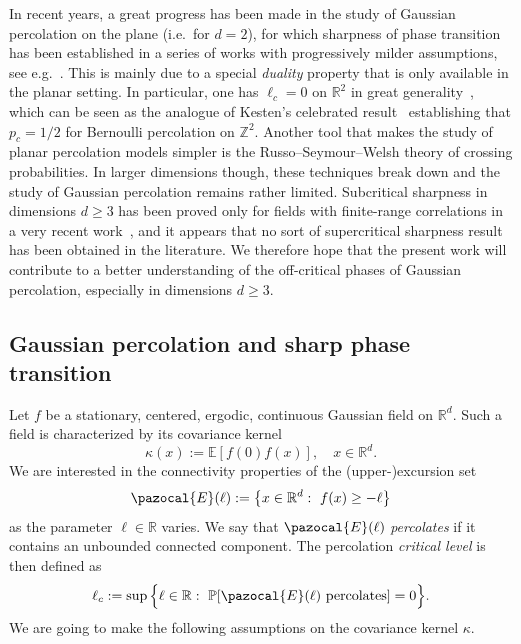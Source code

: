 \documentclass[10pt]{amsart}
\theoremstyle{definition}\newtheorem{defi}[theo]{Definition}\newtheorem{rema}[theo]{Remark}\newtheorem{exam}[theo]{Example}\newtheorem{exem}[theo]{Example}\newtheorem{nota}[theo]{Notation}
\renewcommand{\P}{\mathbb{P}}
\newcommand{\E}{\mathbb{E}}
\newcommand{\R}{\mathbb{R}}
\newcommand{\Z}{\mathbb{Z}}
\begin{document}
In recent years, a great progress has been made in the study of Gaussian percolation on the plane (i.e.~for $d=2$), for which sharpness of phase transition has been established in a series of works with progressively milder assumptions, see e.g.~\cite{Riv19,RVb,MRV20,MV}. This is mainly due to a special \emph{duality} property that is only available in the planar setting. In particular, one has $\ell_c=0$ on $\R^2$ in great generality~\cite{MRV20}, which can be seen as the analogue of Kesten's celebrated result~\cite{Kes80} establishing that $p_c=1/2$ for Bernoulli percolation on $\Z^2$. Another tool that makes the study of planar percolation models simpler is the Russo--Seymour--Welsh theory of crossing probabilities. In larger dimensions though, these techniques break down and the study of Gaussian percolation remains rather limited. Subcritical sharpness in dimensions $d\geq3$ has been proved only for fields with finite-range correlations in a very recent work~\cite{DM21}, and it appears that no sort of supercritical sharpness result has been obtained in the literature. We therefore hope that the present work will contribute to a better understanding of the off-critical phases of Gaussian percolation, especially in dimensions $d\geq3$.


\subsection{Gaussian percolation and sharp phase transition}

Let $f$ be a stationary, centered, ergodic, continuous Gaussian field on $\R^d$. Such a field is characterized by its covariance kernel
\begin{equation}
\kappa(x):=\E\left[f(0)f(x)\right],\quad x\in\R^d.
\end{equation}
We are interested in the connectivity properties of the (upper-)excursion set
\begin{equation}
\pazocal{E}(\ell):=\left\{x\in\R^d:~f(x)\geq -\ell\right\}
\end{equation}
as the parameter $\ell\in \R$ varies. We say that $\pazocal{E}(\ell)$ \emph{percolates} if it contains an unbounded connected component. The percolation \emph{critical level} is then defined as
\begin{equation}\label{eq:l_c_def}
\ell_c:=\sup\Big\{\ell\in \R:~\P[\pazocal{E}(\ell) \text{ percolates}]=0\Big\}.
\end{equation}
We are going to make the following assumptions on the covariance kernel $\kappa$.
\end{document}
